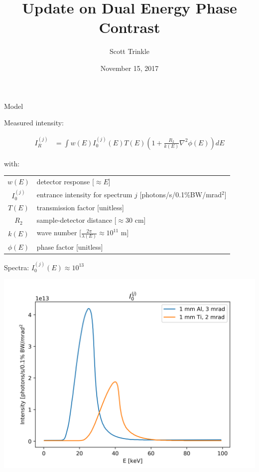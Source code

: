 \documentclass[presentation]{beamer}
\author{Scott Trinkle}
\date{November 15, 2017}
\title{Update on Dual Energy Phase Contrast}
\begin{document}
\frame{\titlepage}

\begin{frame}{Model}

  Measured intensity:
  
  \begin{align}
    I_R^{(j)} &= \int w(E) I_0^{(j)}(E) T(E) \left(1 + \frac{R_2}{k(E)} \nabla^2 \phi(E)\right)dE
  \end{align}

  with:\newline

  \begin{tabular}{c l}
    $w(E)$ & detector response [$\approx E$]\\
    $I_0^{(j)}$ & entrance intensity for spectrum $j$ [photons/s/0.1\%BW/mrad$^2$]\\
    $T(E)$ & transmission factor [unitless]\\
    $R_2$ & sample-detector distance [$\approx$30 cm]\\
    $k(E)$ & wave number [$\frac{2\pi}{\lambda(E)} \approx 10^{11}$ m]\\
    $\phi(E)$ & phase factor [unitless]
  \end{tabular}


\end{frame}

\begin{frame}{Spectra: $I_0^{(j)}(E) \approx 10^{13}$}

  \centering
  \includegraphics[width=0.8\linewidth]{figs/spectra}

\end{frame}
\end{document}
